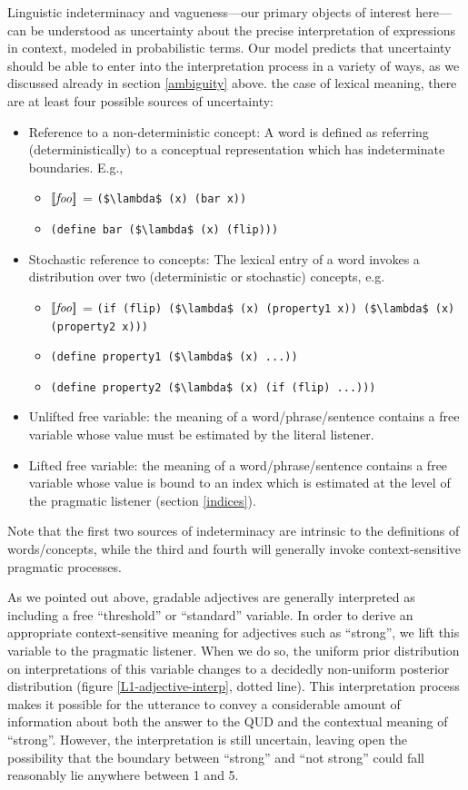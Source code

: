 \documentclass[pdfextras]{handbook}
\newcommand{\llbracket}{\ensuremath{\left [\!\left [}}%
\newcommand{\rrbracket}{\ensuremath{\right ]\!\right ]}}
\providecommand{\sv}[1]{\ensuremath{\llbracket \mathit{#1} \rrbracket}}
\begin{document}
Linguistic indeterminacy and vagueness---our primary objects of interest here---can be understood as uncertainty about the precise interpretation of expressions in context, modeled in probabilistic terms. 
Our model predicts that uncertainty should be able to enter into the interpretation process in a variety of ways, as we discussed already in section \ref{ambiguity} above. 
 the case of lexical meaning, there are at least four possible sources of uncertainty:
\begin{itemize}
\item Reference to a non-deterministic concept: A word is defined as referring (deterministically) to a conceptual representation which has indeterminate boundaries. E.g., 
\begin{itemize}
\item \sv{foo} = \lstinline[mathescape]{($\lambda$ (x) (bar x))}
\item \lstinline[mathescape]{(define bar ($\lambda$ (x) (flip)))}
\end{itemize}
\item Stochastic reference to concepts: The lexical entry of a word invokes a distribution over two (deterministic or stochastic) concepts, e.g.  
\begin{itemize}
\item \sv{foo} = \lstinline[mathescape]{(if (flip) ($\lambda$ (x) (property1 x)) ($\lambda$ (x) (property2 x)))}
\item \lstinline[mathescape]{(define property1 ($\lambda$ (x) ...))}
\item \lstinline[mathescape]{(define property2 ($\lambda$ (x) (if (flip) ...)))}
\end{itemize}
\item Unlifted free variable: the meaning of a word/phrase/sentence contains a free variable whose value must be estimated by the literal listener. 
\item Lifted free variable: the meaning of a word/phrase/sentence contains a free variable whose value is bound to an index which is estimated at the level of the pragmatic listener (section \ref{indices}). 
\end{itemize}
Note that the first two sources of indeterminacy are intrinsic to the definitions of words/concepts, while the third and fourth will generally invoke context-sensitive pragmatic processes. 

As we pointed out above, gradable adjectives are generally interpreted as including a free ``threshold'' or ``standard'' variable. In order to derive an appropriate context-sensitive meaning for adjectives such as ``strong'', we lift this variable to the pragmatic listener. 
When we do so, the uniform prior distribution on interpretations of this variable changes to a decidedly non-uniform posterior distribution (figure \ref{L1-adjective-interp}, dotted line). 
This interpretation process makes it possible for the utterance to convey a considerable amount of information about both the answer to the QUD and the contextual meaning of ``strong''. 
However, the interpretation is still uncertain, leaving open the possibility that the boundary between ``strong'' and ``not strong'' could fall reasonably lie anywhere between 1 and 5.
\end{document}
